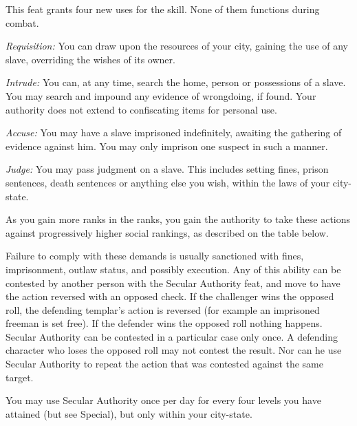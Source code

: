 {This feat grants four new uses for the  skill. None of them functions during combat.

\textit{Requisition:} You can draw upon the resources of your city, gaining the use of any slave, overriding the wishes of its owner.

\textit{Intrude:} You can, at any time, search the home, person or possessions of a slave. You may search and impound any evidence of wrongdoing, if found. Your authority does not extend to confiscating items for personal use.

\textit{Accuse:} You may have a slave imprisoned indefinitely, awaiting the gathering of evidence against him. You may only imprison one suspect in such a manner.

\textit{Judge:} You may pass judgment on a slave. This includes setting fines, prison sentences, death sentences or anything else you wish, within the laws of your city-state.

As you gain more ranks in the  ranks, you gain the authority to take these actions against progressively higher social rankings, as described on the table below.


Failure to comply with these demands is usually sanctioned with fines, imprisonment, outlaw status, and possibly execution. Any of this ability can be contested by another person with the Secular Authority feat, and move to have the action reversed with an opposed  check. If the challenger wins the opposed roll, the defending templar's action is reversed (for example an imprisoned freeman is set free). If the defender wins the opposed roll nothing happens. Secular Authority can be contested in a particular case only once. A defending character who loses the opposed roll may not contest the result. Nor can he use Secular Authority to repeat the action that was contested against the same target.

You may use Secular Authority once per day for every four levels you have attained (but see Special), but only
within your city-state.}

